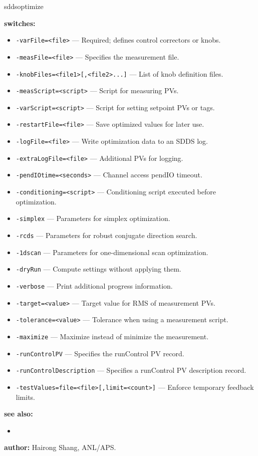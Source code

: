 \begin{sddsprog}{sddsoptimize}
\begin{itemize}
\end{itemize}

\item \textbf{switches:}
\begin{itemize}
  \item {\tt -varFile=<file>} --- Required; defines control correctors or knobs.
  \item {\tt -measFile=<file>} --- Specifies the measurement file.
  \item {\tt -knobFiles=<file1>[,<file2>...]} --- List of knob definition files.
  \item {\tt -measScript=<script>} --- Script for measuring PVs.
  \item {\tt -varScript=<script>} --- Script for setting setpoint PVs or tags.
  \item {\tt -restartFile=<file>} --- Save optimized values for later use.
  \item {\tt -logFile=<file>} --- Write optimization data to an SDDS log.
  \item {\tt -extraLogFile=<file>} --- Additional PVs for logging.
  \item {\tt -pendIOtime=<seconds>} --- Channel access pendIO timeout.
  \item {\tt -conditioning=<script>} --- Conditioning script executed before optimization.
  \item {\tt -simplex} --- Parameters for simplex optimization.
  \item {\tt -rcds} --- Parameters for robust conjugate direction search.
  \item {\tt -1dscan} --- Parameters for one-dimensional scan optimization.
  \item {\tt -dryRun} --- Compute settings without applying them.
  \item {\tt -verbose} --- Print additional progress information.
  \item {\tt -target=<value>} --- Target value for RMS of measurement PVs.
  \item {\tt -tolerance=<value>} --- Tolerance when using a measurement script.
  \item {\tt -maximize} --- Maximize instead of minimize the measurement.
  \item {\tt -runControlPV} --- Specifies the runControl PV record.
  \item {\tt -runControlDescription} --- Specifies a runControl PV description record.
  \item {\tt -testValues=file=<file>[,limit=<count>]} --- Enforce temporary feedback limits.
\end{itemize}
\item \textbf{see also:}
\begin{itemize}
  \item {}
\end{itemize}
\item \textbf{author:} Hairong Shang, ANL/APS.
\end{sddsprog}
